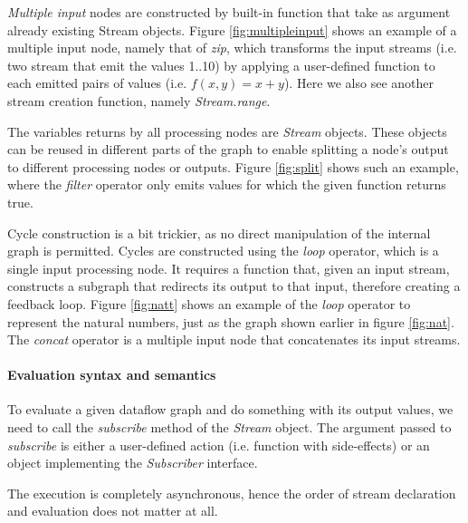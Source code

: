 \documentclass[sigplan,review,anonymous]{acmart}
\begin{document}

\textit{Multiple input} nodes are constructed by built-in function that take as
argument already existing Stream objects. Figure \ref{fig:multipleinput} shows
an example of a multiple input node, namely that of \textit{zip}, which
transforms the input streams (i.e. two stream that emit the values 1..10) by
applying a user-defined function to each emitted pairs of values (i.e.
$f(x,y)=x+y$). Here we also see another stream creation function, namely
\textit{Stream.range}.


The variables returns by all processing nodes are \textit{Stream} objects. These
objects can be reused in different parts of the graph to enable splitting a
node's output to different processing nodes or outputs. Figure \ref{fig:split}
shows such an example, where the \textit{filter} operator only emits values for
which the given function returns true.


Cycle construction is a bit trickier, as no direct manipulation of the internal
graph is permitted. Cycles are constructed using the \textit{loop} operator,
which is a single input processing node. It requires a function that, given an
input stream, constructs a subgraph that redirects its output to that input,
therefore creating a feedback loop. Figure \ref{fig:natt} shows an example of
the \textit{loop} operator to represent the natural numbers, just as the graph
shown earlier in figure \ref{fig:nat}. The \textit{concat} operator is a
multiple input node that concatenates its input streams.


\paragraph{Evaluation syntax and semantics}
To evaluate a given dataflow graph and do something with its output values, we
need to call the \textit{subscribe} method of the \textit{Stream} object. The
argument passed to \textit{subscribe} is either a user-defined action (i.e.
function with side-effects) or an object implementing the \textit{Subscriber}
interface.

The execution is completely asynchronous, hence the order of stream declaration
and evaluation does not matter at all.
\end{document}
